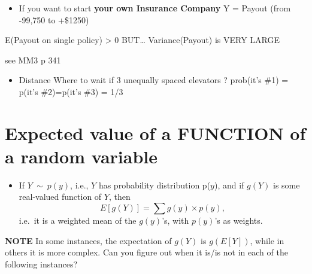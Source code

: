 \documentclass[]{book}
\providecommand{\tightlist}{%
  \setlength{\itemsep}{0pt}\setlength{\parskip}{0pt}}
\begin{document}
\begin{itemize}
\tightlist
\item
  If you want to start \textbf{your own Insurance Company}
  Y = Payout (from -99,750 to +\$1250)
\end{itemize}

E(Payout on single policy) \textgreater{} 0 BUT\ldots{}
Variance(Payout) is VERY LARGE

see MM3 p 341

\begin{itemize}
\tightlist
\item
  Distance Where to wait if 3 unequally spaced elevators ?
  prob(it's \#1) = p(it's \#2)=p(it's \#3) = 1/3
\end{itemize}

\hypertarget{expected-value-of-a-function-of-a-random-variable}{%
\section{Expected value of a FUNCTION of a random variable}\label{expected-value-of-a-function-of-a-random-variable}}

\begin{itemize}
\tightlist
\item
  If \(Y \ \sim \ p(y)\), i.e., \(Y\) has probability distribution p(\(y\)), and if \(g(Y)\) is some real-valued function of \(Y\), then
  \[E[ g(Y) ] = \sum g(y)  \times p(y),\]
  i.e.~it is a weighted mean of the \(g(y)\)'s, with \(p(y)\)'s as weights.
\end{itemize}

\textbf{NOTE} In some instances, the expectation of \(g(Y)\) is \(g(E[Y])\), while in others it is more complex. Can you figure out when it is/is not in each of the following instances?
\end{document}
